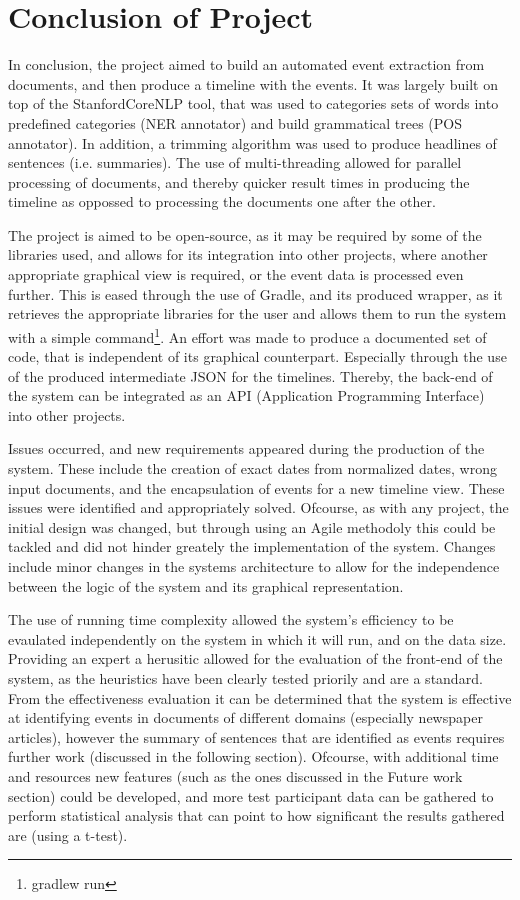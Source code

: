 \section{Conclusion of Project}
\par In conclusion, the project aimed to build an automated event extraction from documents, and then produce a timeline with the events. It was largely built on top of the StanfordCoreNLP tool, that was used to categories sets of words into predefined categories (NER annotator) and build grammatical trees (POS annotator). In addition, a trimming algorithm was used to produce headlines of sentences (i.e. summaries). The use of multi-threading allowed for parallel processing of documents, and thereby quicker result times in producing the timeline as oppossed to processing the documents one after the other. 
\par The project is aimed to be open-source, as it may be required by some of the libraries used, and allows for its integration into other projects, where another appropriate graphical view is required, or the event data is processed even further. This is eased through the use of Gradle, and its produced wrapper, as it retrieves the appropriate libraries for the user and allows them to run the system with a simple command\footnote{gradlew run}. An effort was made to produce a documented set of code, that is independent of its graphical counterpart. Especially through the use of the produced intermediate JSON for the timelines. Thereby, the back-end of the system can be integrated as an API (Application Programming Interface) into other projects. 
\par Issues occurred, and new requirements appeared during the production of the system. These include the creation of exact dates from normalized dates, wrong input documents, and the encapsulation of events for a new timeline view. These issues were identified and appropriately solved. Ofcourse, as with any project, the initial design was changed, but through using an Agile methodoly this could be tackled and did not hinder greately the implementation of the system. Changes include minor changes in the systems architecture to allow for the independence between the logic of the system and its graphical representation.
\par The use of running time complexity allowed the system's efficiency to be evaulated independently on the system in which it will run, and on the data size. Providing an expert a herusitic allowed for the evaluation of the front-end of the system, as the heuristics have been clearly tested priorily and are a standard. From the effectiveness evaluation it can be determined that the system is effective at identifying events in documents of different domains (especially newspaper articles), however the summary of sentences that are identified as events requires further work (discussed in the following section). Ofcourse, with additional time and resources new features (such as the ones discussed in the Future work section) could be developed, and more test participant data can be gathered to perform statistical analysis that can point to how significant the results gathered are (using a t-test). 
\par 
